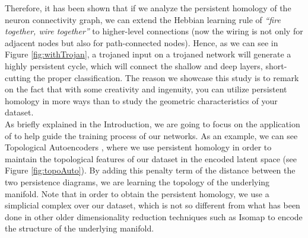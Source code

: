 \documentclass[../main.tex]{subfiles}
\begin{document}
Therefore, it has been shown that if we analyze the persistent homology of the neuron connectivity graph, we can extend the Hebbian learning rule of \textit{``fire together, wire together''} to higher-level connections (now the wiring is not only for adjacent nodes but also for path-connected nodes). Hence, as we can see in Figure \ref{fig:withTrojan}, a trojaned input on a trojaned network will generate a highly persistent cycle, which will connect the shallow and deep layers, short-cutting the proper classification. The reason we showcase this study is to remark on the fact that with some creativity and ingenuity, you can utilize persistent homology in more ways than to study the geometric characteristics of your dataset.\\

As briefly explained in the Introduction, we are going to focus on the application of  to help guide the training process of our networks. As an example, we can see Topological Autoencoders \cite{moor_topological_2021}, where we use persistent homology in order to maintain the topological features of our dataset in the encoded latent space (see Figure \ref{fig:topoAuto}). By adding this penalty term of the distance between the two persistence diagrams, we are learning the topology of the underlying manifold. Note that in order to obtain the persistent homology, we use a simplicial complex over our dataset, which is not so different from what has been done in other older dimensionality reduction techniques such as Isomap \cite{tenenbaum_global_2000} to encode the structure of the underlying manifold.  
\end{document}
